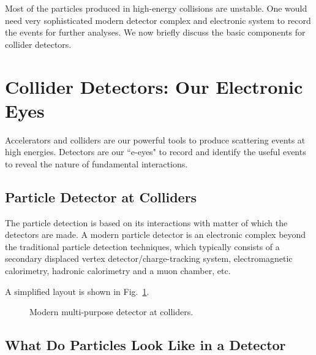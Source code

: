 \documentclass[prd,aps,floats,preprintnumbers,preprint,superscriptaddress,floatfix,nofootinbib]{revtex4}
\begin{document}
Most of the particles produced in high-energy collisions are unstable.
One would need very sophisticated modern detector complex and
electronic system to record the events for further analyses. 
We now briefly discuss the basic components for collider detectors.

\section{Collider Detectors:  Our Electronic Eyes}
\label{detector}

Accelerators and colliders are our powerful tools to produce 
scattering events at high energies. Detectors are our  ``e-eyes"
to record and identify the useful events to reveal the nature of 
fundamental interactions.

\subsection{Particle Detector at Colliders}
The particle detection is based on its interactions with matter of which
the detectors are made. 
A modern particle detector is an electronic complex beyond the traditional
particle detection techniques,  which typically consists of a 
secondary displaced vertex detector/charge-tracking system, 
electromagnetic calorimetry, hadronic calorimetry and a muon chamber, etc. 

A simplified layout is shown in Fig.~\ref{fig:detect}.

\begin{center}
\begin{figure}[tb]
\caption{Modern multi-purpose detector at colliders.
\label{fig:detect}}
\end{figure}
\end{center}

\subsection{What Do Particles Look Like in a Detector}
\end{document}
